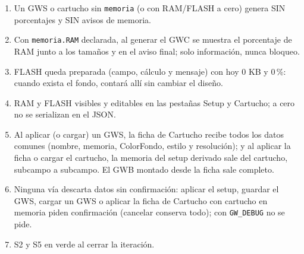 \begin{enumerate}
	\item Un GWS o cartucho sin \texttt{memoria} (o con RAM/FLASH a cero)
	genera SIN porcentajes y SIN avisos de memoria.
	\item Con \texttt{memoria.RAM} declarada, al generar el GWC se muestra el
	porcentaje de RAM junto a los tamaños y en el aviso final; solo
	información, nunca bloqueo.
	\item FLASH queda preparada (campo, cálculo y mensaje) con hoy 0 KB y
	0\,\%: cuando exista el fondo, contará allí sin cambiar el diseño.
	\item RAM y FLASH visibles y editables en las pestañas Setup y Cartucho;
	a cero no se serializan en el JSON.
	\item Al aplicar (o cargar) un GWS, la ficha de Cartucho recibe todos
	los datos comunes (nombre, memoria, ColorFondo, estilo y resolución);
	y al aplicar la ficha o cargar el cartucho, la memoria del setup
	derivado sale del cartucho, subcampo a subcampo. El GWB montado desde
	la ficha sale completo.
	\item Ninguna vía descarta datos sin confirmación: aplicar el setup,
	guardar el GWS, cargar un GWS o aplicar la ficha de Cartucho con
	cartucho en memoria piden confirmación (cancelar conserva todo);
	con \texttt{GW\_DEBUG} no se pide.
	\item S2 y S5 en verde al cerrar la iteración.
\end{enumerate}